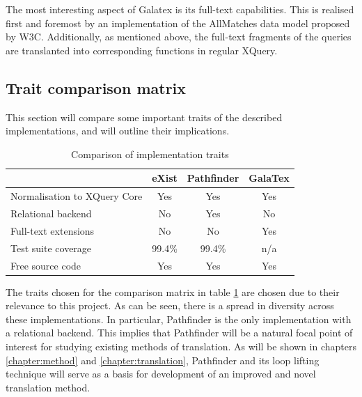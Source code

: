 The most interesting aspect of Galatex is its full-text capabilities. This is
realised first and foremost by an implementation of the AllMatches data model
proposed by W3C\cite{w3c01}. Additionally, as mentioned above, the full-text fragments of the queries are
translanted into corresponding functions in regular XQuery. 

\subsection{Trait comparison matrix}
\label{sect:theory:existing_implementations:comparison}
This section will compare some important traits of the described
implementations, and will outline their implications.
\begin{table}[!h]
	\centering
	\begin{tabular}{ | p{3cm} | c | c | c |}
	\hline
	& eXist & Pathfinder & GalaTex \\ \hline
	Normalisation to XQuery Core & Yes & Yes & Yes \\ \hline
	Relational backend & No & Yes & No \\ \hline
	Full-text extensions & No & No & Yes \\ \hline
	Test suite coverage & 99.4\% & 99.4\% & n/a \\ \hline
	Free source code & Yes & Yes & Yes  \\
	\hline
	\end{tabular}
	\caption{Comparison of implementation traits}
	\label{figure:comparison_matrix}
\end{table}
The traits chosen for the comparison matrix in table
\ref{figure:comparison_matrix} are chosen due to their relevance to this
project. As can be seen, there is a spread in diversity across these
implementations. In particular, Pathfinder is the only implementation with a
relational backend. This implies that Pathfinder will be a natural focal point
of interest for studying existing methods of translation. As will be shown in
chapters \ref{chapter:method} and \ref{chapter:translation}, Pathfinder and
its loop lifting technique will serve as a basis for development of an
improved and novel translation method.